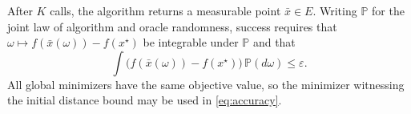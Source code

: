 \documentclass[10pt]{article}
\theoremstyle{definition}
\begin{document}
After $K$ calls, the algorithm returns a measurable point $\bar{x}\in E$. Writing $\mathbb{P}$ for the joint law of algorithm and oracle randomness, success requires that $\omega\mapsto f(\bar{x}(\omega))-f(x^\star)$ be integrable under $\mathbb{P}$ and that
\begin{equation}
\label{eq:accuracy}
\int \bigl(f(\bar{x}(\omega))-f(x^\star)\bigr)\,\mathbb{P}(d\omega)
\leq \varepsilon.
\end{equation}
All global minimizers have the same objective value, so the minimizer witnessing the initial distance bound may be used in \eqref{eq:accuracy}.
\end{document}
